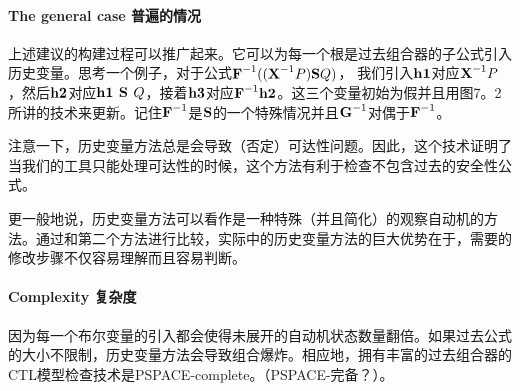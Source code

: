 \documentclass{book}
\begin{document}
    \paragraph{The general case 普遍的情况} 上述建议的构建过程可以推广起来。它可以为每一个根是过去组合器的子公式引入历史变量。思考一个例子，对于公式$\text{\textbf{F}}^{-1}((\text{\textbf{X}}^{-1}P)\text{\textbf{S}}Q)$，
    我们引入$\text{\textbf{h1}}$对应$\text{\textbf{X}}^{-1}P$，然后$\text{\textbf{h2}}$对应$\text{\textbf{h1 S }}Q$，接着$\text{\textbf{h3}}$对应$\text{\textbf{F}}^{-1}\text{\textbf{h2}}$。这三个变量初始为假并且用图7。2所讲的技术来更新。记住$\text{\textbf{F}}^{-1}$是$\text{\textbf{S}}$的一个特殊情况并且$\text{\textbf{G}}^{-1}$对偶于$\text{\textbf{F}}^{-1}$。

    注意一下，历史变量方法总是会导致（否定）可达性问题。因此，这个技术证明了当我们的工具只能处理可达性的时候，这个方法有利于检查不包含过去的安全性公式。

    更一般地说，历史变量方法可以看作是一种特殊（并且简化）的观察自动机的方法。通过和第二个方法进行比较，实际中的历史变量方法的巨大优势在于，需要的修改步骤不仅容易理解而且容易判断。

    \paragraph{Complexity 复杂度} 因为每一个布尔变量的引入都会使得未展开的自动机状态数量翻倍。如果过去公式的大小不限制，历史变量方法会导致组合爆炸。相应地，拥有丰富的过去组合器的CTL模型检查技术是PSPACE-complete。（PSPACE-完备？）。
\end{document}
